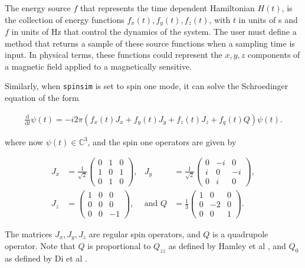 \documentclass{jors}
\begin{document}
			The energy source \(f\) that represents the time dependent Hamiltonian \(H(t)\), is the collection of energy functions \(f_x(t), f_y(t), f_z(t)\), with \(t\) in units of s and \(f\) in units of Hz that control the dynamics of the system. The user must define a method that returns a sample of these source functions when a sampling time is input. In physical terms, these functions could represent the \(x,y,z\) components of a magnetic field applied to a magnetically sensitive.

			Similarly, when \texttt{spinsim} is set to spin one mode, it can solve the Schroedinger equation of the form

			\begin{align*}
				\frac{\mathrm{d}}{\mathrm{d}t}\psi(t) = -i 2\pi (f_x(t) J_x + f_y(t) J_y + f_z(t) J_z + f_q(t) Q) \psi(t).
			\end{align*}

			where now \(\psi(t) \in \mathbb{C}^3\), and the spin one operators are given by

			\begin{align*}
				J_x &= \frac{1}{\sqrt{2}}\begin{pmatrix}
					0 & 1 & 0 \\
					1 & 0 & 1 \\
					0 & 1 & 0
				\end{pmatrix},&
				J_y &= \frac{1}{\sqrt{2}}\begin{pmatrix}
					0 & -i &  0 \\
					i &  0 & -i \\
					0 &  i &  0
				\end{pmatrix},\\
				J_z &= \begin{pmatrix}
					1 & 0 &  0 \\
					0 & 0 &  0 \\
					0 & 0 & -1
				\end{pmatrix},&
				\textrm{and }Q &= \frac{1}{3}\begin{pmatrix}
					1 &  0 & 0 \\
					0 & -2 & 0 \\
					0 &  0 & 1
				\end{pmatrix}.
			\end{align*}

			The matrices \(J_x, J_y, J_z\) are regular spin operators, and \(Q\) is a quadrupole operator. Note that \(Q\) is proportional to \(Q_{zz}\) as defined by Hamley et al \cite{hamley_spin-nematic_2012}, and \(Q_0\) as defined by Di et al \cite{di_dipolequadrupole_2010}.
\end{document}

